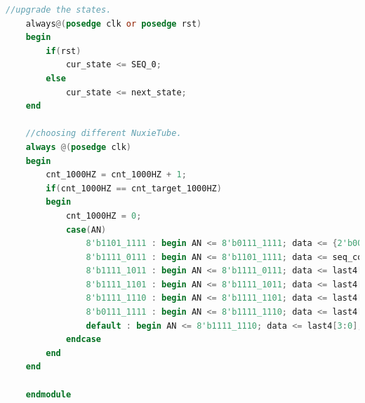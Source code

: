 \documentclass[UTF8]{article}
\begin{document}
\begin{lstlisting}[language=Verilog]
	//upgrade the states.
	always@(posedge clk or posedge rst)
	begin
		if(rst)
			cur_state <= SEQ_0;
		else
			cur_state <= next_state;
	end
	
	//choosing different NuxieTube.
	always @(posedge clk)
	begin
		cnt_1000HZ = cnt_1000HZ + 1;
		if(cnt_1000HZ == cnt_target_1000HZ)
		begin
			cnt_1000HZ = 0;
			case(AN)
				8'b1101_1111 : begin AN <= 8'b0111_1111; data <= {2'b00, cur_state}; end
				8'b1111_0111 : begin AN <= 8'b1101_1111; data <= seq_counter; end
				8'b1111_1011 : begin AN <= 8'b1111_0111; data <= last4[3]; end
				8'b1111_1101 : begin AN <= 8'b1111_1011; data <= last4[2]; end
				8'b1111_1110 : begin AN <= 8'b1111_1101; data <= last4[1]; end
				8'b0111_1111 : begin AN <= 8'b1111_1110; data <= last4[0]; end
				default : begin AN <= 8'b1111_1110; data <= last4[3:0]; end
			endcase
		end
	end
	
	endmodule
	\end{lstlisting}
	
\end{document}
